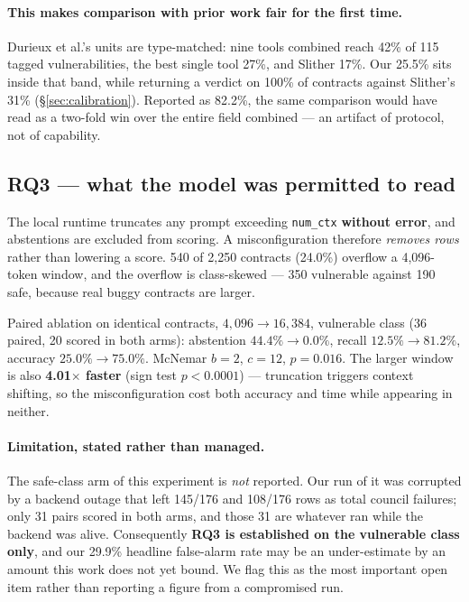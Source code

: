 \documentclass[sigconf,nonacm]{acmart}
\begin{document}
\paragraph{This makes comparison with prior work fair for the first time.}
Durieux et al.'s units are type-matched: nine tools combined reach 42\% of 115
tagged vulnerabilities, the best single tool 27\%, and Slither 17\%. Our 25.5\%
sits inside that band, while returning a verdict on 100\% of contracts against
Slither's 31\% (\S\ref{sec:calibration}). Reported as 82.2\%, the same comparison
would have read as a two-fold win over the entire field combined --- an artifact
of protocol, not of capability.

\subsection{RQ3 --- what the model was permitted to read}
\label{sec:rq3}

The local runtime truncates any prompt exceeding \texttt{num\_ctx}
\textbf{without error}, and abstentions are excluded from scoring. A
misconfiguration therefore \emph{removes rows} rather than lowering a score. 540
of 2,250 contracts (24.0\%) overflow a 4,096-token window, and the overflow is
class-skewed --- 350 vulnerable against 190 safe, because real buggy contracts are
larger.

Paired ablation on identical contracts, $4{,}096 \rightarrow 16{,}384$,
vulnerable class (36 paired, 20 scored in both arms): abstention
$44.4\% \rightarrow 0.0\%$, recall $12.5\% \rightarrow 81.2\%$, accuracy
$25.0\% \rightarrow 75.0\%$. McNemar $b = 2$, $c = 12$, $p = 0.016$. The larger
window is also \textbf{4.01$\times$ faster} (sign test $p < 0.0001$) ---
truncation triggers context shifting, so the misconfiguration cost both accuracy
and time while appearing in neither.

\paragraph{Limitation, stated rather than managed.}
The safe-class arm of this experiment is \emph{not} reported. Our run of it was
corrupted by a backend outage that left 145/176 and 108/176 rows as total council
failures; only 31 pairs scored in both arms, and those 31 are whatever ran while
the backend was alive. Consequently \textbf{RQ3 is established on the vulnerable
class only}, and our 29.9\% headline false-alarm rate may be an under-estimate by
an amount this work does not yet bound. We flag this as the most important open
item rather than reporting a figure from a compromised run.
\end{document}
